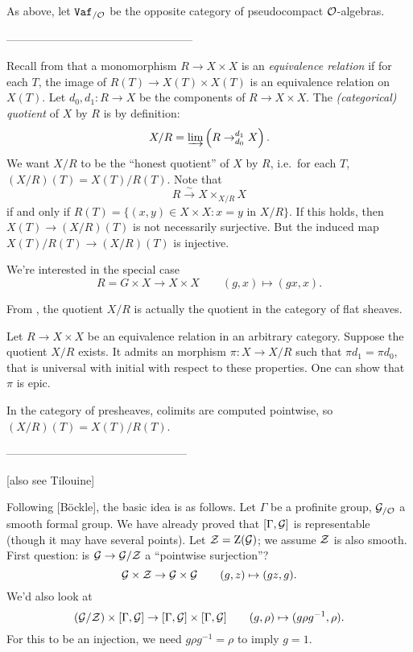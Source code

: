 \documentclass[phd,cornellheadings,draft]{cornell}
\begin{document}
As above, let $\mathtt{Vaf}_{/\mathcal{O}}$ be the opposite category of pseudocompact 
$\mathcal{O}$-algebras. 

--------------------------------------------------

Recall from \cite[V.2.b]{sga3-i} that a monomorphism $R\to X\times X$ is an 
\emph{equivalence relation} if for each $T$, the image of 
$R(T)\to X(T)\times X(T)$ is an equivalence relation on $X(T)$. Let 
$d_0,d_1\colon R\to X$ be the components of $R\to X\times X$. The 
\emph{(categorical) quotient} of $X$ by $R$ is by definition:
\[
  X/R = \varinjlim\left(R\to_{d_0}^{d_1} X\right) .
\]
We want $X/R$ to be the ``honest quotient'' of $X$ by $R$, i.e.~for each $T$, 
$(X/R)(T) = X(T)/R(T)$. Note that 
\[
  R\xrightarrow\sim X\times_{X/R} X
\]
if and only if $R(T)=\{(x,y)\in X\times X\colon x=y\text{ in }X/R\}$. If this 
holds, then $X(T)\to (X/R)(T)$ is not necessarily surjective. But the induced 
map $X(T)/R(T)\to (X/R)(T)$ is injective. 

We're interested in the special case 
\[
  R = G\times X\to X\times X\qquad (g,x)\mapsto (g x,x) .
\]

From \cite[VII\textsubscript{B}.1.5]{sga3-i}, the quotient $X/R$ is actually 
the quotient in the category of flat sheaves. 

Let $R\to X\times X$ be an equivalence relation in an arbitrary category. Suppose 
the quotient $X/R$ exists. It admits an morphism $\pi\colon X\to X/R$ such that 
$\pi d_1 = \pi d_0$, that is universal with initial with respect to these 
properties. One can show that $\pi$ is epic. 

In the category of presheaves, colimits are computed pointwise, so 
$(X/R)(T) = X(T)/R(T)$. 

------------------------------------------------

[also see Tilouine]

Following [B\"ockle], the basic idea is as follows. Let $\Gamma$ be a profinite 
group, $\mathcal{G}_{/\mathcal{O}}$ a smooth formal group. We have already proved that 
$[\Gamma,\mathcal{G}]$ is representable (though it may have several points). Let 
$\mathcal{Z}=\operatorname{Z}(\mathcal{G})$; we assume $\mathcal{Z}$ is also smooth. First question: is 
$\mathcal{G}\to \mathcal{G}/\mathcal{Z}$ a ``pointwise surjection''?
\[
  \mathcal{G}\times \mathcal{Z}\to \mathcal{G}\times \mathcal{G} \qquad (g,z)\mapsto (g z,g) .
\]
We'd also look at 
\[
  (\mathcal{G}/\mathcal{Z})\times [\Gamma,\mathcal{G}]\to [\Gamma,\mathcal{G}]\times [\Gamma,\mathcal{G}]\qquad (g,\rho) \mapsto (g \rho g^{-1}, \rho) .
\]
For this to be an injection, we need $g\rho g^{-1} = \rho$ to imply 
$g=1$. 
\end{document}
